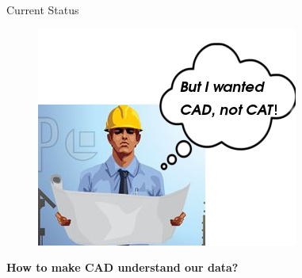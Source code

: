 \begin{frame}{Current Status}
\begin{minipage}[t]{0.6\linewidth}
\begin{figure}
\includegraphics[width=0.9\linewidth]{Pictures/engineerThoughts2.png}
\end{figure}
\vspace{1.5mm}
\end{minipage}
\textbf{How to make CAD understand our data?}
\end{frame}

